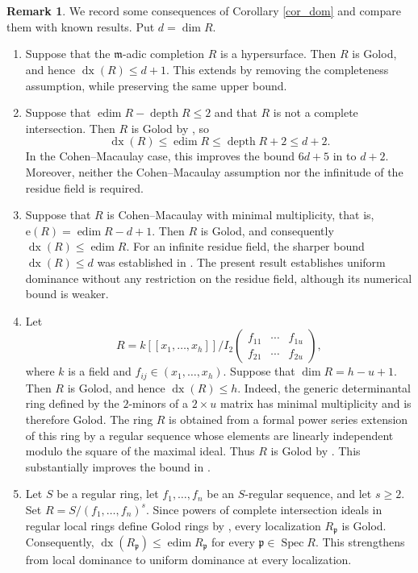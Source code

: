 \documentclass[10pt]{amsart}
\theoremstyle{definition}
\newtheorem{rem}[thm]{Remark}
\theoremstyle{remark}
\numberwithin{equation}{thm}
\def\depth{\operatorname{depth}}
\def\dim{\operatorname{dim}}
\def\edim{\operatorname{edim}}
\def\ge{\geqslant}
\def\le{\leqslant}
\def\m{\mathfrak{m}}
\begin{document}
\begin{rem}\label{appl}
We record some consequences of Corollary \ref{cor_dom}
and compare them with known results.
Put $d=\dim R$.

\begin{enumerate}[\rm(1)]
\item
Suppose that the $\m$-adic completion $\widehat R$
is a hypersurface.
Then $R$ is Golod, and hence
$\operatorname{dx}(R)\le d+1$.
This extends \cite[Corollary 6.4]{KT2026}
by removing the completeness assumption,
while preserving the same upper bound.

\item
Suppose that
$\edim R-\depth R\le2$
and that $R$ is not a complete intersection.
Then $R$ is Golod by \cite[Propositions 5.2.5 and 5.3.4]{A1998}, so
\[
\operatorname{dx}(R)
\le\edim R
\le\depth R+2
\le d+2.
\]
In the Cohen--Macaulay case, this improves the
bound $6d+5$ in \cite[Theorem 6.14(2)]{KT2026}
to $d+2$. Moreover, neither the Cohen--Macaulay
assumption nor the infinitude of the residue
field is required.

\item
Suppose that $R$ is Cohen--Macaulay with
minimal multiplicity, that is,
$\mathrm e(R)=\edim R-d+1$.
Then $R$ is Golod, and consequently
$\operatorname{dx}(R)\le\edim R$.
For an infinite residue field, the sharper bound
$\operatorname{dx}(R)\le d$ was established in
\cite[Proposition 6.7(1b)]{KT2026}.
The present result establishes uniform dominance
without any restriction on the residue field,
although its numerical bound is weaker.
\item
Let
\[
R=k[\![x_1,\ldots,x_h]\!]/
I_2\begin{pmatrix}
f_{11}&\cdots&f_{1u}\\
f_{21}&\cdots&f_{2u}
\end{pmatrix},
\]
where $k$ is a field and
$f_{ij}\in(x_1,\ldots,x_h)$.
Suppose that $\dim R=h-u+1$.
Then $R$ is Golod, and hence
$\operatorname{dx}(R)\le h$.
Indeed, the generic determinantal ring defined
by the $2$-minors of a $2\times u$ matrix has
minimal multiplicity and is therefore Golod.
The ring $R$ is obtained from a formal power
series extension of this ring by a regular
sequence whose elements are linearly independent
modulo the square of the maximal ideal.
Thus $R$ is Golod by
\cite[Proposition 5.2.4(3)]{A1998}.
This substantially improves the bound in
\cite[Corollary 6.8]{T2026}.
\item
Let $S$ be a regular ring, let
$f_1,\ldots,f_n$ be an $S$-regular sequence,
and let $s\ge 2$.
Set $R=S/(f_1,\ldots,f_n)^s$.
Since powers of complete intersection ideals
in regular local rings define Golod rings
by \cite[Corollary 3.3]{GS1980},
every localization $R_{\mathfrak p}$ is Golod.
Consequently,
$\operatorname{dx}(R_{\mathfrak p})
\le \edim R_{\mathfrak p}$ for every $\mathfrak p\in\operatorname{Spec} R$.
This strengthens \cite[Proposition 5.1]{KMOT2026}
from local dominance to uniform dominance
at every localization.

\end{enumerate}
\end{rem}
\end{document}

